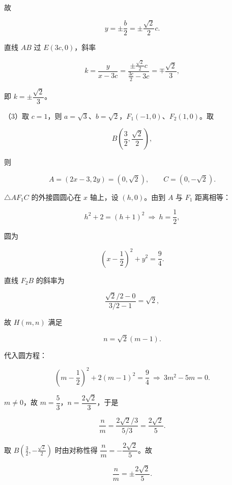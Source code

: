 \begin{answer}
故

\nopagebreak[4]
\[y=\pm\frac b2=\pm\frac{\sqrt2}{2}c .\]

直线 $AB$ 过 $E(3c,0)$，斜率

\nopagebreak[4]
\[k=\frac{y}{x-3c}
=\frac{\pm\frac{\sqrt2}{2}c}{\frac{3c}{2}-3c}
=\mp\frac{\sqrt2}{3},\]

即 $k=\pm\dfrac{\sqrt2}{3}$。

（3）取 $c=1$，则 $a=\sqrt3$、$b=\sqrt2$，$F_1(-1,0)$、$F_2(1,0)$。取

\nopagebreak[4]
\[B\left(\frac32,\frac{\sqrt2}{2}\right),\]

则

\nopagebreak[4]
\[A=(2x-3,2y)=(0,\sqrt2),\qquad C=(0,-\sqrt2).\]

$\triangle AF_1C$ 的外接圆圆心在 $x$ 轴上，设 $(h,0)$。由到 $A$ 与 $F_1$ 距离相等：

\nopagebreak[4]
\[h^2+2=(h+1)^2\ \Longrightarrow\ h=\frac12,\]

圆为

\nopagebreak[4]
\[\left(x-\frac12\right)^2+y^2=\frac94 .\]

直线 $F_2B$ 的斜率为

\nopagebreak[4]
\[\frac{\sqrt2/2-0}{3/2-1}=\sqrt2,\]

故 $H(m,n)$ 满足

\nopagebreak[4]
\[n=\sqrt2(m-1).\]

代入圆方程：

\nopagebreak[4]
\[\left(m-\frac12\right)^2+2(m-1)^2=\frac94
\ \Longrightarrow\ 3m^2-5m=0 .\]

$m\ne0$，故 $m=\dfrac53$，$n=\dfrac{2\sqrt2}{3}$，于是

\nopagebreak[4]
\[\frac nm=\frac{2\sqrt2/3}{5/3}=\frac{2\sqrt2}{5} .\]

取 $B\left(\frac32,-\frac{\sqrt2}{2}\right)$ 时由对称性得 $\dfrac nm=-\dfrac{2\sqrt2}{5}$。故

\nopagebreak[4]
\[\frac nm=\pm\frac{2\sqrt2}{5} .\]


\end{answer}